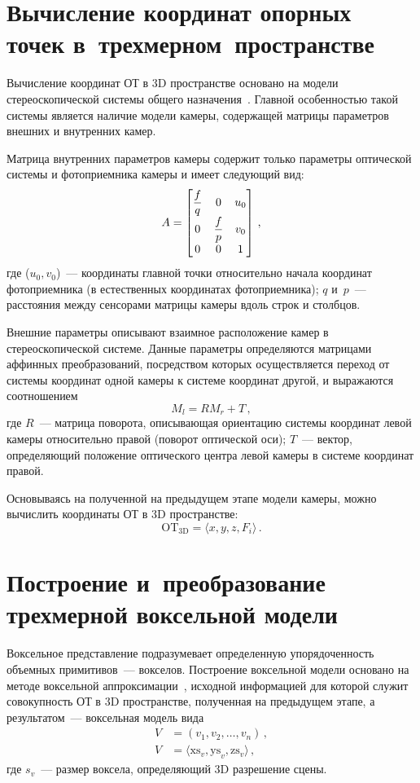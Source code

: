 \begin{multicols}{2}
\section{Вычисление координат опорных точек в~трехмерном~пространстве}

  Вычисление координат ОТ в 3D пространстве основано на модели 
стереоскопической системы общего назначения~\cite{1-arh}. Главной 
осо\-бен\-ностью такой системы является наличие модели камеры, содержащей 
матрицы параметров внешних и внут\-рен\-них камер.
  
  Матрица внутренних параметров камеры содержит только параметры 
оптической системы и фотоприемника камеры и имеет следующий вид:
  $$
  A=\begin{bmatrix}
  \displaystyle\frac{\displaystyle f\mathstrut}{\displaystyle q\mathstrut} & 0 &u_0\\
  0 & \displaystyle\frac{\displaystyle f\mathstrut}{\displaystyle p\mathstrut} & v_0\\
  0 &0&1
  \end{bmatrix}\,,
  $$
где ($u_0, v_0$)~--- координаты главной точки относительно начала координат 
фотоприемника (в естественных координатах фотоприемника); 
  $q$ и~$p$~--- рас\-сто\-яния между сенсорами матрицы камеры вдоль строк и 
столбцов.
  
  Внешние параметры описывают взаимное расположение камер в 
стереоскопической системе. Данные параметры определяются матрицами 
аффинных преобразований, посредством которых осуществляется переход от 
системы координат одной камеры к системе координат другой, и выражаются 
соотношением
  $$
  M_l=RM_r+T\,,
  $$
где $R$~--- мат\-ри\-ца поворота, описывающая ориентацию системы 
координат левой камеры относительно правой (поворот оптической оси);
$T$~--- вектор, определяющий положение оптического центра левой камеры в 
системе координат правой.
  
  Основываясь на полученной на предыдущем этапе модели камеры, можно 
вычислить координаты ОТ в 3D пространстве:
$$
\mathrm{OT}_{\mathrm{3D}} = \langle x, y, z, F_i\rangle\,.
$$

\vspace*{-9pt}
  
\section{Построение и~преобразование трехмерной воксельной 
модели}
  
  Воксельное представление подразумевает определенную упорядоченность 
объемных примитивов~--- вокселов. Построение воксельной модели основано на 
методе воксельной аппроксимации~\cite{2-arh}, исходной информацией для 
которой служит совокупность ОТ в 3D пространстве, полученная на 
предыдущем этапе, а результатом~--- воксельная модель вида
  \begin{align*}
V &= \left(v_1, v_2, \ldots , v_n\right)\,,\\
V &= \langle \mathrm{xs}_v, \mathrm{ys}_v, \mathrm{zs}_v\rangle\,,
\end{align*}
где $s_v$~--- размер воксела, определяющий 3D разрешение сцены.
  

\end{multicols}
